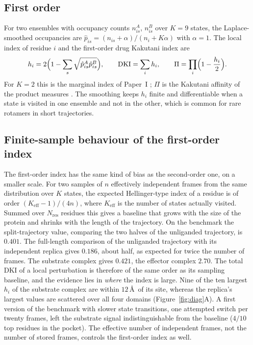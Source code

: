 \documentclass[11pt,reqno]{amsart}
\theoremstyle{plain}
\theoremstyle{definition}
\theoremstyle{remark}
\numberwithin{equation}{section}
\begin{document}
\subsection*{First order}
For two ensembles with occupancy counts $n^A_{is}$, $n^B_{is}$ over $K=9$ states, the Laplace-smoothed occupancies are $\hat p_{is}=(n_{is}+\alpha)/(n_i+K\alpha)$ with $\alpha=1$. The local index of residue $i$ and the first-order drug Kakutani index are
\begin{equation}\label{eq:dki}
h_i=2\Bigl(1-\sum_s\sqrt{\hat p^A_{is}\hat p^B_{is}}\Bigr),\qquad \mathrm{DKI}=\sum_ih_i,\qquad \Pi=\prod_i\Bigl(1-\frac{h_i}2\Bigr).
\end{equation}
For $K=2$ this is the marginal index of Paper~I \cite{ChenChen2026I}; $\Pi$ is the Kakutani affinity of the product measures \cite{Kakutani1948}. The smoothing keeps $h_i$ finite and differentiable when a state is visited in one ensemble and not in the other, which is common for rare rotamers in short trajectories.

\subsection*{Finite-sample behaviour of the first-order index}
The first-order index has the same kind of bias as the second-order one, on a smaller scale. For two samples of $n$ effectively independent frames from the same distribution over $K$ states, the expected Hellinger-type index of a residue is of order $(K_{\mathrm{eff}}-1)/(4n)$, where $K_{\mathrm{eff}}$ is the number of states actually visited. Summed over $N_{\mathrm{res}}$ residues this gives a baseline that grows with the size of the protein and shrinks with the length of the trajectory. On the benchmark the split-trajectory value, comparing the two halves of the unliganded trajectory, is $0.401$. The full-length comparison of the unliganded trajectory with its independent replica gives $0.186$, about half, as expected for twice the number of frames. The substrate complex gives $0.421$, the effector complex $2.70$. The total DKI of a local perturbation is therefore of the same order as its sampling baseline, and the evidence lies in \emph{where} the index is large. Nine of the ten largest $h_i$ of the substrate complex are within $12$\,\AA\ of its site, whereas the replica's largest values are scattered over all four domains (Figure~\ref{fig:diag}A). A first version of the benchmark with slower state transitions, one attempted switch per twenty frames, left the substrate signal indistinguishable from the baseline ($4/10$ top residues in the pocket). The effective number of independent frames, not the number of stored frames, controls the first-order index as well.
\end{document}
